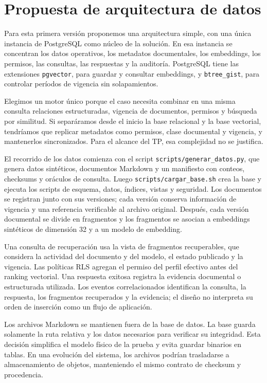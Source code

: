 \section{Propuesta de arquitectura de datos}

Para esta primera versión proponemos una arquitectura simple, con una única instancia de PostgreSQL como núcleo de la solución. En esa instancia se concentran los datos operativos, los metadatos documentales, los embeddings, los permisos, las consultas, las respuestas y la auditoría. PostgreSQL tiene las extensiones \texttt{pgvector}, para guardar y consultar embeddings, y \texttt{btree\_gist}, para controlar períodos de vigencia sin solapamientos.

Elegimos un motor único porque el caso necesita combinar en una misma consulta relaciones estructuradas, vigencia de documentos, permisos y búsqueda por similitud. Si separáramos desde el inicio la base relacional y la base vectorial, tendríamos que replicar metadatos como permisos, clase documental y vigencia, y mantenerlos sincronizados. Para el alcance del TP, esa complejidad no se justifica.

El recorrido de los datos comienza con el script \texttt{scripts/generar\_datos.py}, que genera datos sintéticos, documentos Markdown y un manifiesto con conteos, checksums y oráculos de consulta. Luego \texttt{scripts/cargar\_base.sh} crea la base y ejecuta los scripts de esquema, datos, índices, vistas y seguridad. Los documentos se registran junto con sus versiones; cada versión conserva información de vigencia y una referencia verificable al archivo original. Después, cada versión documental se divide en fragmentos y los fragmentos se asocian a embeddings sintéticos de dimensión 32 y a un modelo de embedding.

Una consulta de recuperación usa la vista de fragmentos recuperables, que considera la actividad del documento y del modelo, el estado publicado y la vigencia. Las políticas RLS agregan el permiso del perfil efectivo antes del ranking vectorial. Una respuesta exitosa registra la evidencia documental o estructurada utilizada. Los eventos correlacionados identifican la consulta, la respuesta, los fragmentos recuperados y la evidencia; el diseño no interpreta su orden de inserción como un flujo de aplicación.

Los archivos Markdown se mantienen fuera de la base de datos. La base guarda solamente la ruta relativa y los datos necesarios para verificar su integridad. Esta decisión simplifica el modelo físico de la prueba y evita guardar binarios en tablas. En una evolución del sistema, los archivos podrían trasladarse a almacenamiento de objetos, manteniendo el mismo contrato de checksum y procedencia.

